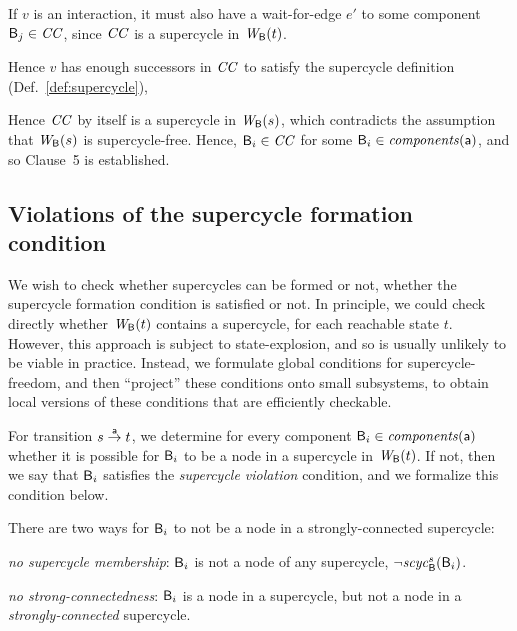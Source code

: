 {If $v$ is an interaction, it must also have a wait-for-edge $e'$ to some component $\B_j \in \CC$, since $\CC$ is
a supercycle in $\wfg{\B}{t}$. 

Hence $v$ has enough successors in $\CC$ to satisfy the supercycle definition (Def.~\ref{def:supercycle}), 

Hence $\CC$ by itself is a supercycle in $\wfg{\B}{s}$,
which contradicts the assumption that 
$\wfg{\B}{s}$ is supercycle-free. Hence, $\B_i \in \CC$ for some $\B_i \in \cmps{\act}$, and so Clause~5 is established.
}





\subsection{Violations of the supercycle formation condition}

We wish to check whether supercycles can be formed or not, \ie whether the supercycle formation
condition is satisfied or not. In principle, we could check directly
whether $\wfg{\B}{t}$ contains a supercycle, for each reachable state
$t$. However, this approach is subject to state-explosion, and so is usually unlikely to be viable in practice.
Instead, we formulate global conditions for supercycle-freedom, and then ``project'' these
conditions onto small subsystems, to obtain local versions of these conditions that are efficiently checkable.

For transition $s \goesto[\act] t$, we determine for every component $\B_i \in \cmps{\act}$ whether
it is possible for $\B_i$ to be a node in a supercycle in $\wfg{\B}{t}$. 
 If not, then we say that $\B_i$ satisfies the \emph{supercycle
  violation} condition, and we formalize this condition below.

There are two ways for $\B_i$ to not be a node in a strongly-connected supercycle:
\bn
\item \textit{no supercycle membership}: $\B_i$ is not a node of any supercycle, \ie $\neg \scyc{\B}{s}{\B_i}$.

\item \textit{no strong-connectedness}: $\B_i$ is a node in a supercycle, but not a node in a \emph{strongly-connected} supercycle. 

\en





